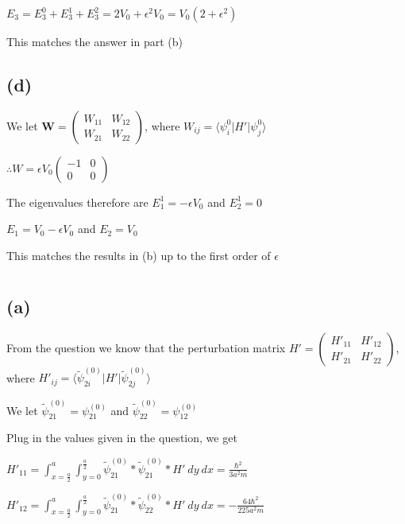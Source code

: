 \documentclass[12pt]{article}
\begin{document}
\begin{spacing}{2.0}
$E_3=E_3^0+E_3^1+E_3^2= 2V_0 + \epsilon^2 V_0 = V_0(2+\epsilon^2)$

This matches the answer in part (b)

\subsection*{(d)}
We let $\mathbf{W}=\left(
\begin{array}{ccc}
W_{11} & W_{12}  \\
W_{21} & W_{22}
\end{array}
\right)$, where $W_{ij}=\langle \psi_i^0 | H' | \psi_j^0 \rangle$

$\therefore W=\epsilon V_0 \left(
\begin{array}{cc}
-1 & 0\\
0  & 0
\end{array}
\right)$

The eigenvalues therefore are $E_1^1=-\epsilon V_0$ and $E_2^1=0$

$E_1=V_0-\epsilon V_0$ and $E_2=V_0$

This matches the results in (b) up to the first order of $\epsilon$

\section{} %
\subsection*{(a)}
From the question we know that the perturbation matrix $H'=\left(
\begin{array}{cc}
H'_{11} & H'_{12}\\
H'_{21} & H'_{22}
\end{array}
\right)$, where $H'_{ij}= \langle \widetilde{\psi}_{2i}^{(0)} |H'| \widetilde{\psi}_{2j}^{(0)} \rangle$

We let $\widetilde{\psi}_{21}^{(0)}= \psi_{21}^{(0)}$ and $\widetilde{\psi}_{22}^{(0)}= \psi_{12}^{(0)}$

Plug in the values given in the question, we get

$H'_{11}=\int_{x=\frac{a}{2}}^a \int_{y=0}^{\frac{a}{2}} \widetilde{\psi}_{21}^{(0)}* \widetilde{\psi}_{21}^{(0)}* H'\ dy\ dx= \frac{\hbar ^2}{3 a^2 m}$

$H'_{12}=\int_{x=\frac{a}{2}}^a \int_{y=0}^{\frac{a}{2}} \widetilde{\psi}_{21}^{(0)}* \widetilde{\psi}_{22}^{(0)}* H'\ dy\ dx= -\frac{64 \hbar ^2}{225 a^2 m}$


\end{spacing}
\end{document}
